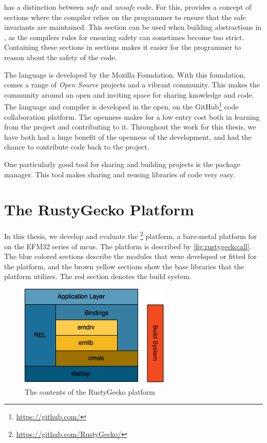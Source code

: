 {\rust} has a distinction between \emph{safe} and \emph{unsafe} code.
For this, {\rust} provides a concept of {\unsafe} sections where the compiler relies on the programmer to ensure that the safe invariants are maintained.
This section can be used when building abstractions in {\rust}, as the compilers rules for ensuring safety can sometimes become too strict.
Containing these sections in {\unsafe} sections makes it easier for the programmer to reason about the safety of the code.

The {\rust} language is developed by the Mozilla Foundation.
With this foundation, comes a range of \emph{Open Source} projects and a vibrant community.
This makes the community around {\rust} an open and inviting space for sharing knowledge and code.
The {\rust} language and compiler is developed in the open, on the GitHub\footnote{\url{https://github.com/}} code collaboration platform.
The openness makes for a low entry cost both in learning from the project and contributing to it.
Throughout the work for this thesis, we have both had a huge benefit of the openness of the development, and had the chance to contribute code back to the {\rust} project.

One particularly good tool for sharing and building {\rust} projects is the {\cargo} package manager.
This tool makes sharing and reusing libraries of code very easy.

\section{The RustyGecko Platform}

In this thesis, we develop and evaluate the {\rg}\footnote{\url{https://github.com/RustyGecko/}} platform, a bare-metal platform for {\rust} on the EFM32 series of \glspl{mcu}.
The platform is described by \autoref{fig:rustygecko:all}.
The blue colored sections describe the {\rust} modules that were developed or fitted for the platform, and the brown yellow sections show the base {\C} libraries that the platform utilizes.
The red section denotes the build system.

\begin{figure}[H]
  \begin{center}
    \includegraphics{figures/RustyGecko-all.png}
  \end{center}
  \caption{The contents of the RustyGecko platform}
  \label{fig:rustygecko:all}
\end{figure}

